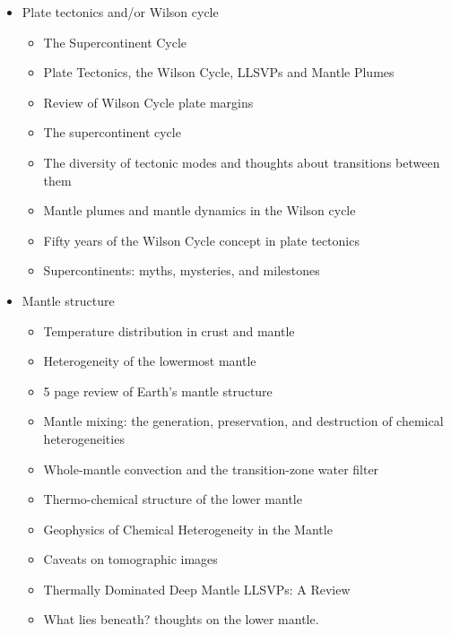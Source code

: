 \begin{itemize}
\item Plate tectonics and/or Wilson cycle
   \begin{itemize}
   \item [\nineteeneightyeight] The Supercontinent Cycle \cite{nawm88}
   \item [\twothousandeleven] Plate Tectonics, the Wilson Cycle, LLSVPs and Mantle Plumes \cite{burk11}
   \item [\twothousandfourteen] Review of Wilson Cycle plate margins \cite{buto14}
   \item [\twothousandfourteen] The supercontinent cycle \cite{nams14}
   \item [\twothousandeighteen] The diversity of tectonic modes and thoughts about transitions between them \cite{lena18}
   \item [\twothousandnineteen] Mantle plumes and mantle dynamics in the Wilson cycle \cite{hero19}
   \item [\twothousandnineteen] Fifty years of the Wilson Cycle concept in plate tectonics \cite{wihb19}
   \item [\twothousandnineteen] Supercontinents: myths, mysteries, and milestones \cite{panm19} 
   \end{itemize}

\item Mantle structure
   \begin{itemize}
   \item [\nineteeneightysix] Temperature distribution in crust and mantle \cite{jemo86}
   \item [\twothousand] Heterogeneity of the lowermost mantle \cite{garn00}
   \item [\twothousandone] 5 page review of Earth's mantle structure \cite{hewo01}
   \item [\twothousandtwo] Mantle mixing: the generation, preservation, and destruction of chemical heterogeneities \cite{vahb02}
   \item [\twothousandthree] Whole-mantle convection and the transition-zone water filter \cite{beka03}
   \item [\twothousandseven] Thermo-chemical structure of the lower mantle \cite{dett07}
   \item [\twothousandtwelve] Geophysics of Chemical Heterogeneity in the Mantle \cite{stli12}
   \item [\twothousandthirteen] Caveats on tomographic images \cite{fopa13}
   \item [\twothousandfifteen] Thermally Dominated Deep Mantle LLSVPs: A Review \cite{dagl15}
   \item [\twothousandnineteen] What lies beneath? thoughts on the lower mantle. \cite{hega19}
   \end{itemize}


\end{itemize}
